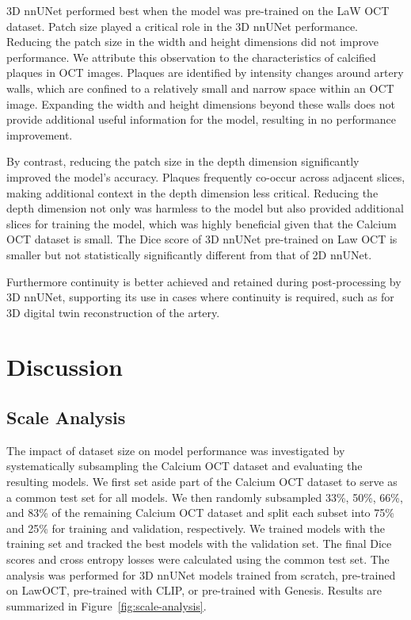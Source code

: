 \documentclass[a4paper,11pt,oneside]{report}
\begin{document}
3D nnUNet performed best when the model was pre-trained on the LaW OCT dataset. Patch size played a critical role in the 3D nnUNet performance. Reducing the patch size in the width and height dimensions did not improve performance. We attribute this observation to the characteristics of calcified plaques in OCT images. Plaques are identified by intensity changes around artery walls, which are confined to a relatively small and narrow space within an OCT image. Expanding the width and height dimensions beyond these walls does not provide additional useful information for the model, resulting in no performance improvement. 

By contrast, reducing the patch size in the depth dimension significantly improved the model’s accuracy. Plaques frequently co-occur across adjacent slices, making additional context in the depth dimension less critical. Reducing the depth dimension not only was harmless to the model but also provided additional slices for training the model, which was highly beneficial given that the Calcium OCT dataset is small. The Dice score of 3D nnUNet pre-trained on Law OCT is smaller but not statistically significantly different from that of 2D nnUNet. 

Furthermore continuity is better achieved and retained during post-processing by 3D nnUNet, supporting its use in cases where continuity is required, such as for 3D digital twin reconstruction of the artery. %

\section{Discussion}
\subsection{Scale Analysis}
The impact of dataset size on model performance was investigated by systematically subsampling the Calcium OCT dataset and evaluating the resulting models. We first set aside part of the Calcium OCT dataset to serve as a common test set for all models. We then randomly subsampled 33\%, 50\%, 66\%, and 83\% of the remaining Calcium OCT dataset and split each subset into 75\% and 25\% for training and validation, respectively. We trained models with the training set and tracked the best models with the validation set. The final Dice scores and cross entropy losses were calculated using the common test set. The analysis was performed for 3D nnUNet models trained from scratch, pre-trained on LawOCT, pre-trained with CLIP, or pre-trained with Genesis. Results are summarized in Figure~\ref{fig:scale-analysis}. 
\end{document}
